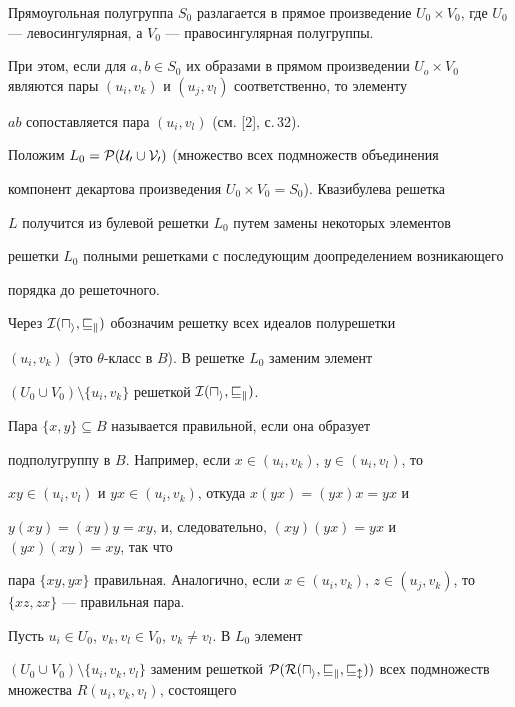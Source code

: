 \begin{pf}
Прямоугольная полугруппа $S_0$ разлагается в прямое произведение $U_0\times


V_0$, где $U_0$ --- левосингулярная, а $V_0$ --- правосингулярная полугруппы.


При этом, если для $a,b\in S_0$ их образами в прямом произведении $U_o\times


V_0$ являются пары $(u_i,v_k)$ и $(u_j,v_l)$ соответственно, то элементу


$ab$ сопоставляется пара $(u_i,v_l)$ (см. [2], с.\,32).





Положим $L_0=\cal P(U_0\cup V_0)$ (множество всех подмножеств объединения


компонент декартова произведения $U_0\times V_0=S_0$). Квазибулева решетка


$L$ получится из булевой решетки $L_0$ путем замены некоторых элементов


решетки $L_0$ полными решетками с последующим доопределением возникающего


порядка до решеточного.


Через $\cal I(u_i,v_k)$ обозначим решетку всех идеалов полурешетки


$(u_i,v_k)$ (это $\theta$-класс в $B$). В решетке $L_0$ заменим элемент


$(U_0\cup V_0)\setminus\{u_i,v_k\}$ решеткой $\cal I(u_i,v_k)$.





Пара $\{x,y\}\subseteq B$ называется правильной, если она образует


подполугруппу в $B$. Например, если $x\in (u_i,v_k)$, $y\in (u_i,v_l)$, то


$xy\in (u_i,v_l)$ и $yx\in (u_i,v_k)$, откуда $x(yx)=(yx)x=yx$ и


$y(xy)=(xy)y=xy$, и, следовательно, $(xy)(yx)=yx$ и $(yx)(xy)=xy$, так что


пара $\{xy,yx\}$ правильная. Аналогично, если $x\in(u_i,v_k)$, $z\in


(u_j,v_k)$, то $\{xz,zx\}$ --- правильная пара.





Пусть $u_i\in U_0$, $v_k,v_l\in V_0$, $v_k\ne v_l$. В $L_0$ элемент


$(U_0\cup V_0)\setminus \{u_i,v_k,v_l\}$ заменим решеткой $\cal


P(R(u_i,v_k,v_l))$ всех подмножеств множества $R(u_i,v_k,v_l)$, состоящего



\end{pf}
